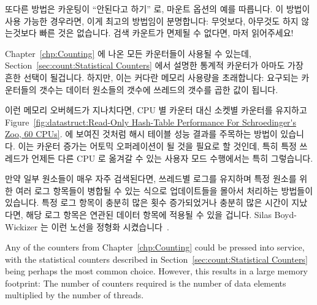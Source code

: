 또다른 방법은 카운팅이 ``안된다고 하기'' 로,  마운트 옵션의 예를
따릅니다.
이 방법이 사용 가능한 경우라면, 이게 최고의 방법임이 분명합니다: 무엇보다,
아무것도 하지 않는것보다 빠른 것은 없습니다.
검색 카운트가 면제될 수 없다면, 마저 읽어주세요!
\iffalse

Suppose that Schr\"odinger also wants to count the number of lookups for
each animal, where lookups are protected by RCU.
How can this counting best be done?

One approach would be to protect a lookup counter with the per-element
lock, as discussed in
Section~\ref{sec:together:Counting Updates}.
Unfortunately, this would require all lookups to acquire this lock,
which would be a severe bottleneck on large systems.

Another approach is to ``just say no'' to counting, following the example
of the \co{noatime} mount option.
If this approach is feasible, it is clearly the best:  After all, nothing
is faster than doing nothing.
If the lookup count cannot be dispensed with, read on!
\fi

Chapter~\ref{chp:Counting} 에 나온 모든 카운터들이 사용될 수 있는데,
Section~\ref{sec:count:Statistical Counters}
에서 설명한 통계적 카운터가 아마도 가장 흔한 선택이 될겁니다.
하지만, 이는 커다란 메모리 사용량을 초래합니다: 요구되는 카운터들의 갯수는
데이터 원소들의 갯수에 쓰레드의 갯수를 곱한 값이 됩니다.

이런 메모리 오버헤드가 지나치다면, CPU 별 카운터 대신 소켓별 카운터를 유지하고
Figure~\ref{fig:datastruct:Read-Only Hash-Table Performance For Schroedinger's Zoo, 60 CPUs}.
에 보여진 것처럼 해시 테이블 성능 결과를 주목하는 방법이 있습니다.
이는 카운터 증가는 어토믹 오퍼레이션이 될 것을 필요로 할 것인데, 특히 특정
쓰레드가 언제든 다른 CPU 로 옮겨갈 수 있는 사용자 모드 수행에서는 특히
그렇습니다.

만약 일부 원소들이 매우 자주 검색된다면, 쓰레드별 로그를 유지하며 특정 원소를
위한 여러 로그 항목들이 병합될 수 있는 식으로 업데이트들을 몰아서 처리하는
방법들이 있습니다.
특정 로그 항목이 충분히 많은 횟수 증가되었거나 충분히 많은 시간이 지났다면,
해당 로그 항목은 연관된 데이터 항목에 적용될 수 있을 겁니다.
Silas Boyd-Wickizer 는 이런 노선을 정형화
시켰습니다~\cite{SilasBoydWickizerPhD}.
\iffalse

Any of the counters from
Chapter~\ref{chp:Counting}
could be pressed into service, with the statistical counters described in
Section~\ref{sec:count:Statistical Counters}
being perhaps the most common choice.
However, this results in a large memory footprint: The number of counters
required is the number of data elements multiplied by the number of
threads.

